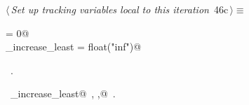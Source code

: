 \documentclass[11.5pt]{report}
\begin{document}
\begin{flushleft} \small\label{scrap70}\raggedright\small
{} $\langle\,${\itshape Set up tracking variables local to this iteration}\nobreak\ {\footnotesize {46c}}$\,\rangle\equiv$
\vspace{-1ex}
\begin{list}{}{} \item
\mbox{}\verb@ibest                = 0@\\
\mbox{}\verb@delta_increase_least = float("inf")@\\
\mbox{}\verb@@{\NWsep}
\end{list}
\vspace{-1.5ex}
\footnotesize
\begin{list}{}{\setlength{\itemsep}{-\parsep}\setlength{\itemindent}{-\leftmargin}}
\item \NWtxtMacroRefIn\ .
\item \NWtxtIdentsDefed\nobreak\  \verb@delta_increase_least@\nobreak\ , \verb@ibest,@\nobreak\ .
\item{}
\end{list}
\vspace{4ex}
\end{flushleft}

\vspace{-0.8cm}\newchunk 
\end{document}
